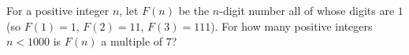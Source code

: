 For a positive integer $n$, let $F(n)$ be the $n$-digit number all of whose digits are $1$ (so $F(1)=1$, $F(2)=11$, $F(3)=111$). For how many positive integers $n<1000$ is $F(n)$ a multiple of $7$?

